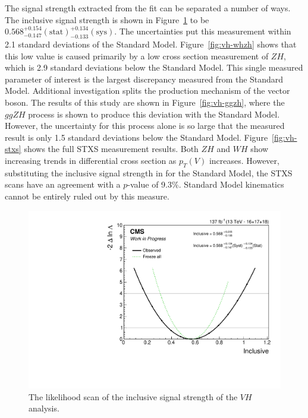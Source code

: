 The signal strength extracted from the fit can be separated a number of ways.
The inclusive signal strength is shown in Figure~\ref{fig:vh-inclusive} to be
$0.568^{+0.154}_{-0.147} \mathrm{(stat)}^{+0.134}_{-0.133} \mathrm{(sys)}$.
The uncertainties put this measurement within 2.1 standard deviations of the Standard Model.
Figure~\ref{fig:vh-whzh} shows that this low value is caused primarily by a low cross section measurement of $Z\!H$,
which is 2.9 standard deviations below the Standard Model.
This single measured parameter of interest is the largest discrepancy measured from the Standard Model.
Additional investigation splits the production mechanism of the vector boson.
The results of this study are shown in Figure~\ref{fig:vh-ggzh},
where the $ggZ\!H$ process is shown to produce this deviation with the Standard Model.
However, the uncertainty for this process alone is so large that the measured result is
only 1.5 standard deviations below the Standard Model.
Figure~\ref{fig:vh-stxs} shows the full STXS measurement results.
Both $Z\!H$ and $W\!H$ show increasing trends in differential cross section as $p_T(V)$ increases.
However, substituting the inclusive signal strength in for the Standard Model,
the STXS scans have an agreement with a $p$-value of 9.3\%.
Standard Model kinematics cannot be entirely ruled out by this measure.

\begin{figure}
  \centering
  \includegraphics[width=0.7\linewidth]{figures/210309_incl_unblinded_Xbb_8f854f5a_a866aef8/scan_nominal_r.pdf}
  \caption[Inclusive likelihood scan of $V\!H$]{
    The likelihood scan of the inclusive signal strength of the
    $V\!H$ analysis.
  }
  \label{fig:vh-inclusive}
\end{figure}

